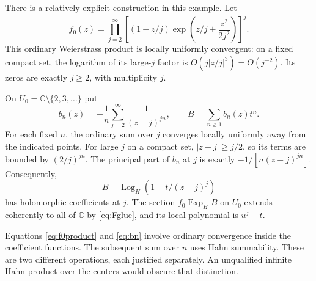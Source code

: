 \documentclass[11pt,letterpaper]{article}
\theoremstyle{definition}
\theoremstyle{remark}
\newcommand{\C}{\mathbb C}
\newcommand{\ExpH}{\operatorname{Exp}_{H}}
\newcommand{\LogH}{\operatorname{Log}_{H}}
\numberwithin{equation}{section}
\begin{document}
There is a relatively explicit construction in this example. Let
\begin{equation}\label{eq:f0product}
 f_0(z)=\prod_{j=2}^{\infty}
 \left[(1-z/j)\exp\!\left(z/j+\frac{z^2}{2j^2}\right)\right]^j.
\end{equation}
This ordinary Weierstrass product is locally uniformly convergent: on a fixed compact set, the logarithm of its large-$j$ factor is $O(j|z/j|^3)=O(j^{-2})$. Its zeros are exactly $j\ge2$, with multiplicity $j$.

On $U_0=\C\setminus\{2,3,\ldots\}$ put
\begin{equation}\label{eq:bn}
 b_n(z)=-\frac1n\sum_{j=2}^{\infty}\frac1{(z-j)^{jn}},
 \qquad B=\sum_{n\ge1}b_n(z)t^n.
\end{equation}
For each fixed $n$, the ordinary sum over $j$ converges locally uniformly away from the indicated points. For large $j$ on a compact set, $|z-j|\ge j/2$, so its terms are bounded by $(2/j)^{jn}$. The principal part of $b_n$ at $j$ is exactly $-1/[n(z-j)^{jn}]$. Consequently,
\[
 B-\LogH(1-t/(z-j)^j)
\]
has holomorphic coefficients at $j$. The section $f_0\ExpH B$ on $U_0$ extends coherently to all of $\C$ by \eqref{eq:Fglue}, and its local polynomial is $u^j-t$.

Equations \eqref{eq:f0product} and \eqref{eq:bn} involve ordinary convergence inside the coefficient functions. The subsequent sum over $n$ uses Hahn summability. These are two different operations, each justified separately. An unqualified infinite Hahn product over the centers would obscure that distinction.
\end{document}
